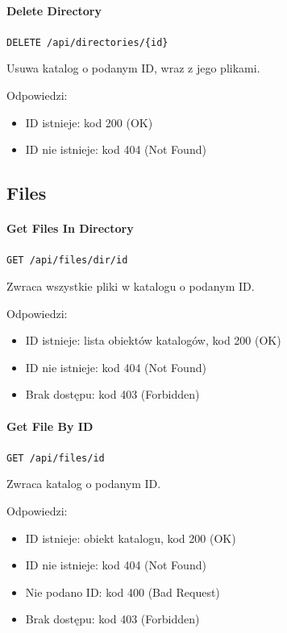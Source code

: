 \documentclass[a4paper,twoside,12pt]{book}
\begin{document}
\paragraph{Delete Directory}\label{delete-directory}

\texttt{DELETE /api/directories/\{id\}}

Usuwa katalog o podanym ID, wraz z jego plikami.

Odpowiedzi: 
\begin{itemize}
	\item ID istnieje: kod 200 (OK) 
	\item ID nie istnieje: kod 404 (Not Found)
\end{itemize}

\subsection{Files}\label{files}

\paragraph{Get Files In Directory}\label{get-files-in-directory}

\texttt{GET /api/files/dir/{id}}

Zwraca wszystkie pliki w katalogu o podanym ID.

Odpowiedzi: 
\begin{itemize}
	\item ID istnieje: lista obiektów katalogów, kod 200 (OK) 
	\item ID nie istnieje: kod 404 (Not Found) 
	\item Brak dostępu: kod 403 (Forbidden)
\end{itemize}

\paragraph{Get File By ID}\label{get-file-by-id}

\texttt{GET /api/files/{id}}

Zwraca katalog o podanym ID.

Odpowiedzi: 
\begin{itemize}
	\item ID istnieje: obiekt katalogu, kod 200 (OK) 
	\item ID nie istnieje: kod 404 (Not Found) 
	\item Nie podano ID: kod 400 (Bad Request) 
	\item Brak dostępu: kod 403 (Forbidden)
\end{itemize}
\end{document}
